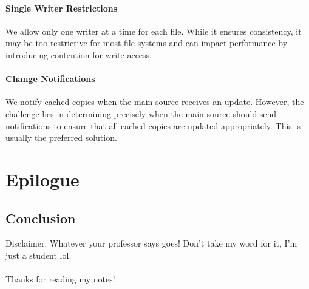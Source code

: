 \documentclass{report}
\begin{document}
\subsection{Single Writer Restrictions}
We allow only one writer at a time for each file. While it ensures consistency, it may be too
restrictive for most file systems and can impact performance by introducing contention for write
access. 


\subsection{Change Notifications}
We notify cached copies when the main source receives an update. However, the
challenge lies in determining precisely when the main source should send notifications to ensure
that all cached copies are updated appropriately. This is usually the preferred solution.










\part*{Epilogue}
\chapter*{Conclusion}
Disclaimer: Whatever your professor says goes! Don't take my word for it, I'm just a student
lol. \\ \\
Thanks for reading my notes!
\end{document}
